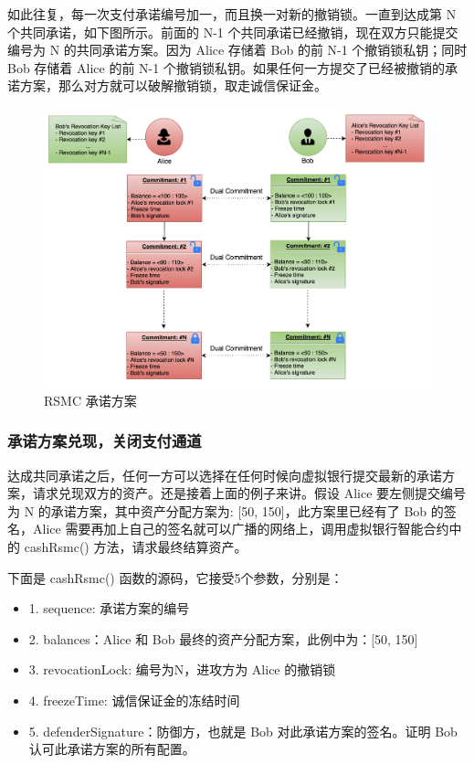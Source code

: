 \begin{appendices}
如此往复，每一次支付承诺编号加一，而且换一对新的撤销锁。一直到达成第 N 个共同承诺，如下图所示。前面的 N-1 个共同承诺已经撤销，现在双方只能提交编号为 N 的共同承诺方案。因为 Alice 存储着 Bob 的前 N-1 个撤销锁私钥；同时 Bob 存储着 Alice 的前 N-1 个撤销锁私钥。如果任何一方提交了已经被撤销的承诺方案，那么对方就可以破解撤销锁，取走诚信保证金。

\begin{figure}[h!]
    \centering
    \includegraphics[width=12cm, keepaspectratio]{../images/dual_rsmc_3.png}
    \caption{RSMC 承诺方案}
    \label{fig:rsmc_3}
\end{figure}

\subsubsection{承诺方案兑现，关闭支付通道}
达成共同承诺之后，任何一方可以选择在任何时候向虚拟银行提交最新的承诺方案，请求兑现双方的资产。还是接着上面的例子来讲。假设 Alice 要左侧提交编号为 N 的承诺方案，其中资产分配方案为: [50, 150]，此方案里已经有了 Bob 的签名，Alice 需要再加上自己的签名就可以广播的网络上，调用虚拟银行智能合约中的 cashRsmc() 方法，请求最终结算资产。

下面是 cashRsmc() 函数的源码，它接受5个参数，分别是：
\begin{itemize}
    \item 1. sequence: 承诺方案的编号
    \item 2. balances：Alice 和 Bob 最终的资产分配方案，此例中为：[50, 150]
    \item 3. revocationLock: 编号为N，进攻方为 Alice 的撤销锁
    \item 4. freezeTime: 诚信保证金的冻结时间
    \item 5. defenderSignature：防御方，也就是 Bob 对此承诺方案的签名。证明 Bob 认可此承诺方案的所有配置。
\end{itemize}


\end{appendices}
